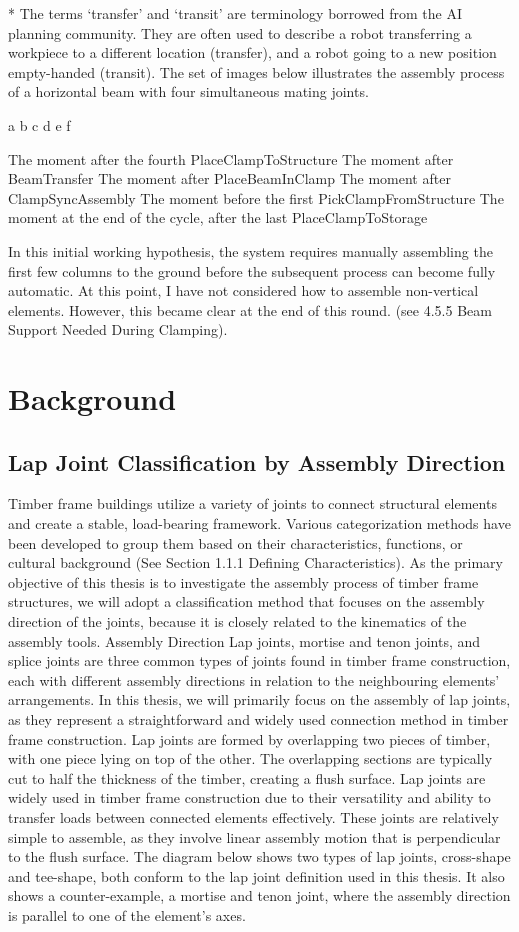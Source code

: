 * The terms ‘transfer’ and ‘transit’ are terminology borrowed from the AI planning community. They are often used to describe a robot transferring a workpiece to a different location (transfer), and a robot going to a new position empty-handed (transit).
The set of images below illustrates the assembly process of a horizontal beam with four simultaneous mating joints. 

a
b
c
d
e
f

The moment after the fourth PlaceClampToStructure 
The moment after BeamTransfer
The moment after PlaceBeamInClamp
The moment after ClampSyncAssembly
The moment before the first PickClampFromStructure
The moment at the end of the cycle, after the last PlaceClampToStorage

In this initial working hypothesis, the system requires manually assembling the first few columns to the ground before the subsequent process can become fully automatic. At this point, I have not considered how to assemble non-vertical elements. However, this became clear at the end of this round. (see  4.5.5 Beam Support Needed During Clamping).

\section{Background}
\subsection{Lap Joint Classification by Assembly Direction}
Timber frame buildings utilize a variety of joints to connect structural elements and create a stable, load-bearing framework. Various categorization methods have been developed to group them based on their characteristics, functions, or cultural background (See Section 1.1.1 Defining Characteristics). As the primary objective of this thesis is to investigate the assembly process of timber frame structures, we will adopt a classification method that focuses on the assembly direction of the joints, because it is closely related to the kinematics of the assembly tools.
Assembly Direction
Lap joints, mortise and tenon joints, and splice joints are three common types of joints found in timber frame construction, each with different assembly directions in relation to the neighbouring elements' arrangements. In this thesis, we will primarily focus on the assembly of lap joints, as they represent a straightforward and widely used connection method in timber frame construction. 
Lap joints are formed by overlapping two pieces of timber, with one piece lying on top of the other. The overlapping sections are typically cut to half the thickness of the timber, creating a flush surface. Lap joints are widely used in timber frame construction due to their versatility and ability to transfer loads between connected elements effectively. These joints are relatively simple to assemble, as they involve linear assembly motion that is perpendicular to the flush surface. 
The diagram below shows two types of lap joints, cross-shape and tee-shape, both conform to the lap joint definition used in this thesis. It also shows a counter-example, a mortise and tenon joint, where the assembly direction is parallel to one of the element’s axes. 


